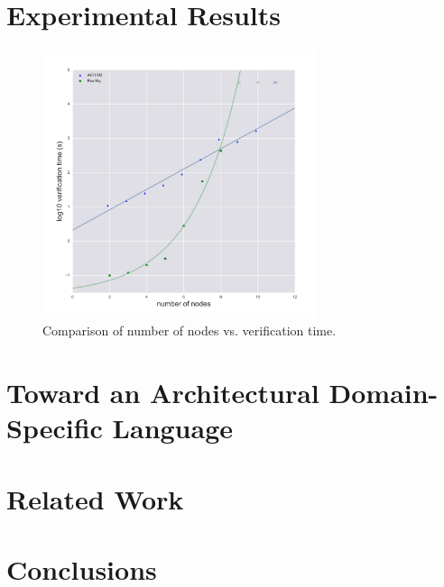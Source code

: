 \documentclass{llncs/llncs}
\newcommand{\lee}[1]{ } %
\newcommand{\lee}[1]{ {\color{blue}$<$lee: #1$>$} } %
\begin{document}
\section{Experimental Results}\label{sec:experimental}

\lee{let's also check out scalability when we ``turn off'' faults. Also, how hard is it to turn them off or change the fault model? E.g., how many lines of spec need to be changed? Compare to rushby's?}

\begin{figure}
  \centering
  \includegraphics[width=8cm]{figs/benchmark}
  \caption{Comparison of number of nodes vs. verification time.}
  \label{fig:compare}
\end{figure}

\section{Toward an Architectural Domain-Specific Language}\label{sec:adsl}

\section{Related Work}\label{sec:related}

\section{Conclusions}\label{sec:conclusions}



\end{document}
